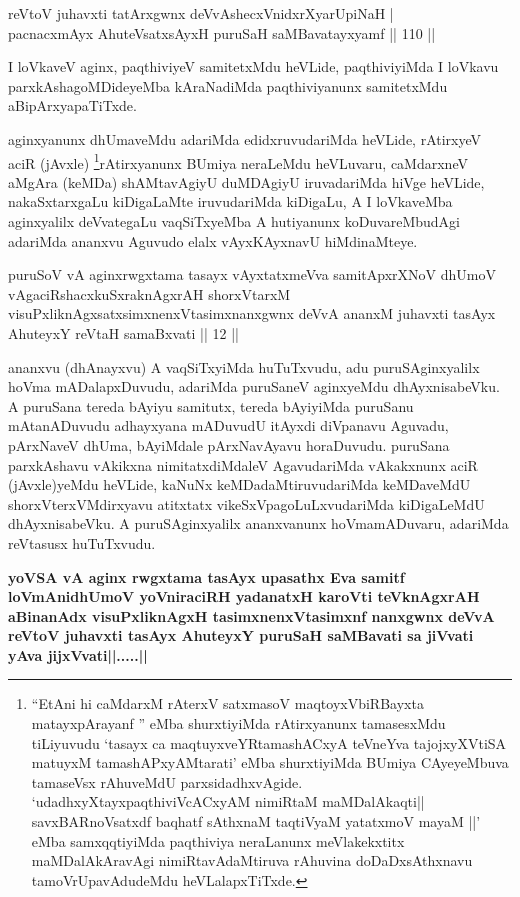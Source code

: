 \begin{shl}
reVtoV juhavxti tatArxgwnx deVvAshecxVnidxrXyarUpiNaH | \\
pacnacxmAyx AhuteVsatxsAyxH puruSaH saMBavatayxyamf \hfill|| 110 || 
\end{shl}

\begin{artha}
I loVkaveV aginx, paqthiviyeV samitetxMdu heVLide, paqthiviyiMda I
loVkavu parxkAshagoMDideyeMba kAraNadiMda paqthiviyanunx samitetxMdu
aBipArxyapaTiTxde.
\end{artha}

\begin{artha}
aginxyanunx dhUmaveMdu adariMda edidxruvudariMda heVLide, rAtirxyeV
aciR (jAvxle) \footnote{``EtAni hi caMdarxM rAterxV satxmasoV maqtoyxVbiRBayxta matayxpArayanf '' eMba shurxtiyiMda rAtirxyanunx
  tamasesxMdu tiLiyuvudu `tasayx ca maqtuyxveYRtamashACxyA teVneYva tajojxyXVtiSA matuyxM tamashAPxyAMtarati' eMba shurxtiyiMda BUmiya CAyeyeMbuva
tamaseVsx rAhuveMdU parxsidadhxvAgide. \\`udadhxyXtayxpaqthiviVcACxyAM nimiRtaM maMDalAkaqti||\\
savxBARnoVsatxdf baqhatf sAthxnaM taqtiVyaM yatatxmoV mayaM ||' \\eMba samxqqtiyiMda
paqthiviya neraLanunx meVlakekxtitx maMDalAkAravAgi nimiRtavAdaMtiruva
rAhuvina doDaDxsAthxnavu tamoVrUpavAdudeMdu heVLalapxTiTxde.}rAtirxyanunx BUmiya neraLeMdu heVLuvaru,
caMdarxneV aMgAra (keMDa) shAMtavAgiyU duMDAgiyU iruvadariMda hiVge
heVLide, nakaSxtarxgaLu kiDigaLaMte iruvudariMda kiDigaLu, A I
loVkaveMba aginxyalilx deVvategaLu vaqSiTxyeMba A hutiyanunx
koDuvareMbudAgi adariMda ananxvu Aguvudo elalx vAyxKAyxnavU
hiMdinaMteye.
\end{artha}


\begin{shl}
puruSoV vA aginxrwgxtama tasayx vAyxtatxmeVva samitApxrXNoV dhUmoV vAgaciRshacxkuSxraknAgxrAH shorxVtarxM visuPxliknAgxsatxsimxnenxVtasimxnanxgwnx deVvA ananxM juhavxti tasAyx AhuteyxY reVtaH samaBxvati || 12 ||
\end{shl}

\begin{artha}
ananxvu (dhAnayxvu) A vaqSiTxyiMda huTuTxvudu, adu puruSAginxyalilx
hoVma mADalapxDuvudu, adariMda puruSaneV aginxyeMdu dhAyxnisabeVku. A
puruSana tereda bAyiyu samitutx, tereda bAyiyiMda puruSanu
mAtanADuvudu adhayxyana mADuvudU itAyxdi diVpanavu Aguvadu, pArxNaveV
dhUma, bAyiMdale pArxNavAyavu horaDuvudu. puruSana parxkAshavu
vAkikxna nimitatxdiMdaleV AgavudariMda vAkakxnunx aciR (jAvxle)yeMdu
heVLide, kaNuNx keMDadaMtiruvudariMda keMDaveMdU shorxVterxVMdirxyavu
atitxtatx vikeSxVpagoLuLxvudariMda kiDigaLeMdU dhAyxnisabeVku. A
puruSAginxyalilx ananxvanunx hoVmamADuvaru, adariMda reVtasusx
huTuTxvudu. 

\textbf{yoVSA vA aginx rwgxtama tasAyx upasathx Eva samitf loVmAnidhUmoV yoVniraciRH yadanatxH karoVti teV\s knAgxrAH aBinanAdx visuPxliknAgxH tasimxnenxVtasimxnf nanxgwnx deVvA reVtoV juhavxti tasAyx AhuteyxY puruSaH saMBavati sa jiVvati yAva jijxVvati||.....||}
\end{artha}


